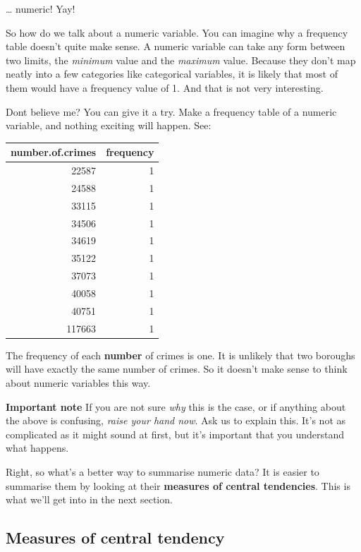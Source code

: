 \documentclass[
]{book}
\begin{document}
\ldots{} numeric! Yay!

So how do we talk about a numeric variable. You can imagine why a frequency table doesn't quite make sense. A numeric variable can take any form between two limits, the \emph{minimum} value and the \emph{maximum} value. Because they don't map neatly into a few categories like categorical variables, it is likely that most of them would have a frequency value of 1. And that is not very interesting.

Dont believe me? You can give it a try. Make a frequency table of a numeric variable, and nothing exciting will happen. See:

\begin{tabular}{r|r}
\hline
number.of.crimes & frequency\\
\hline
22587 & 1\\
\hline
24588 & 1\\
\hline
33115 & 1\\
\hline
34506 & 1\\
\hline
34619 & 1\\
\hline
35122 & 1\\
\hline
37073 & 1\\
\hline
40058 & 1\\
\hline
40751 & 1\\
\hline
117663 & 1\\
\hline
\end{tabular}

The frequency of each \textbf{number} of crimes is one. It is unlikely that two boroughs will have exactly the same number of crimes. So it doesn't make sense to think about numeric variables this way.

\textbf{Important note} If you are not sure \emph{why} this is the case, or if anything about the above is confusing, \emph{raise your hand now}. Ask us to explain this. It's not as complicated as it might sound at first, but it's important that you understand what happens.

Right, so what's a better way to summarise numeric data? It is easier to summarise them by looking at their \textbf{measures of central tendencies}. This is what we'll get into in the next section.

\hypertarget{measures-of-central-tendency}{%
\subsection{Measures of central tendency}\label{measures-of-central-tendency}}
\end{document}
